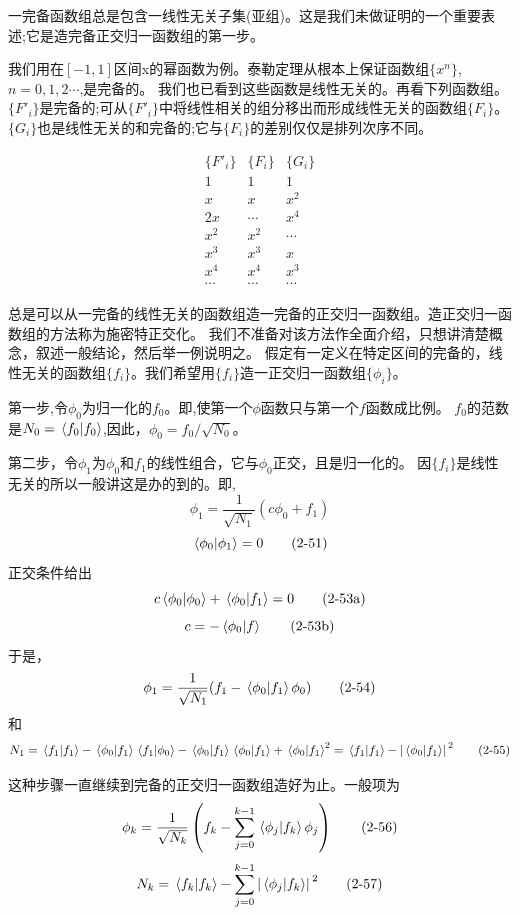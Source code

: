 一完备函数组总是包含一线性无关子集(亚组)。这是我们未做证明的一个重要表述;它是造完备正交归一函数组的第一步。

我们用在$[-1,1]$区间x的幂函数为例。泰勒定理从根本上保证函数组$\{x^n\}$,$n=0,1,2 \cdots $,是完备的。
我们也已看到这些函数是线性无关的。再看下列函数组。$\{F'_i\}$是完备的;可从$\{F'_i\}$中将线性相关的组分移出而形成线性无关的函数组$\{F_i\}$。
$\{G_i\}$也是线性无关的和完备的;它与$\{F_i\}$的差别仅仅是排列次序不同。

\[
\begin{array}{ccc}
    \{F'_i\} & \{F_i\} & \{G_i\} \\
    1 & 1 & 1 \\
    x & x & x^2 \\
    2x & \cdots & x^4 \\
    x^2 & x^2 & \cdots \\
    x^3 & x^3 & x \\
    x^4 & x^4 & x^3 \\
    \cdots & \cdots & \cdots
\end{array}    
\]

总是可以从一完备的线性无关的函数组造一完备的正交归一函数组。造正交归一函数组的方法称为施密特正交化。
我们不准备对该方法作全面介绍，只想讲清楚概念，叙述一般结论，然后举一例说明之。
假定有一定义在特定区间的完备的，线性无关的函数组$\{f_i\}$。我们希望用$\{f_i\}$造一正交归一函数组$\{\phi_i\}$。

第一步,令$\phi_0$为归一化的$f_0$。即,使第一个$\phi$函数只与第一个$f$函数成比例。
$f_0$的范数是$N_0=\bra*{f_0}\ket*{f_0}$,因此，$\phi_0=f_0/\sqrt{N_0}$。

第二步，令$\phi_1$为$\phi_0$和$f_1$的线性组合，它与$\phi_0$正交，且是归一化的。 
因$\{f_i\}$是线性无关的所以一般讲这是办的到的。即,
\[\phi_1=\frac{1}{\sqrt{N_1}}(c\phi_0+f_1) \tag{2-50}\]
\[\bra*{\phi_0}\ket*{\phi_1}=0 \tag{2-51}\]
正交条件给出
\[c\bra*{\phi_0}\ket*{\phi_0}+\bra*{\phi_0}\ket*{f_1}=0 \tag{2-53a}\]
\[c=-\bra*{\phi_0}\ket*{f} \tag{2-53b}\]
于是，
\[\phi_1=\frac{1}{\sqrt{N_1}}(f_1-\bra*{\phi_0}\ket*{f_1}\phi_0) \tag{2-54}\]
和
\[N_1=\bra*{f_1}\ket*{f_1}-\bra*{\phi_0}\ket*{f_1}\bra*{f_1}\ket*{\phi_0}-\bra*{\phi_0}\ket*{f_1}\bra*{\phi_0}\ket*{f_1}+\bra*{\phi_0}\ket*{f_1}^2=\bra*{f_1}\ket*{f_1}-\abs*{\bra*{\phi_0}\ket*{f_1}}^2 \tag{2-55}\]

这种步骤一直继续到完备的正交归一函数组造好为止。一般项为
\[\phi_k=\frac{1}{\sqrt{N_k}} \left ( f_k-\sum_{j=0}^{k-1}\bra*{\phi_j}\ket*{f_k}\phi_j \right ) \tag{2-56}\]
\[N_k=\bra*{f_k}\ket*{f_k}-\sum_{j=0}^{k-1}\abs*{\bra*{\phi_j}\ket*{f_k}}^2 \tag{2-57}\]

